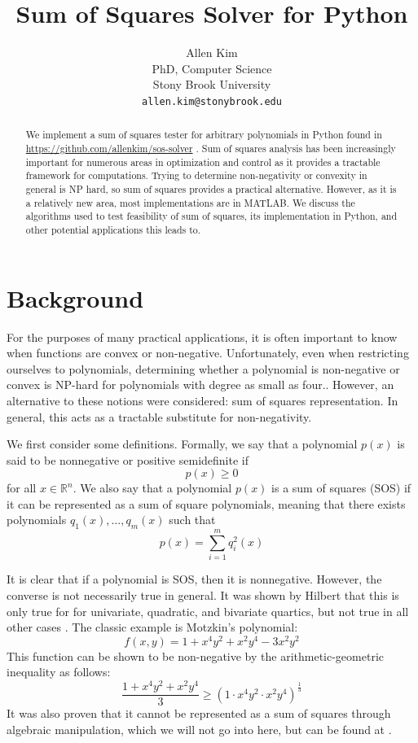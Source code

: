 \documentclass{article}
\title{Sum of Squares Solver for Python}
\author{
  Allen Kim \\
  PhD, Computer Science\\
  Stony Brook University\\
  \texttt{allen.kim@stonybrook.edu} \\
}
\begin{document}

\maketitle

\begin{abstract}
    We implement a sum of squares tester for arbitrary polynomials in Python found in \url{https://github.com/allenkim/sos-solver} . Sum of squares analysis has been increasingly important for numerous areas in optimization and control as it provides a tractable framework for computations. Trying to determine non-negativity or convexity in general is NP hard, so sum of squares provides a practical alternative. However, as it is a relatively new area, most implementations are in MATLAB. We discuss the algorithms used to test feasibility of sum of squares, its implementation in Python, and other potential applications this leads to.
\end{abstract}

\section{Background}

For the purposes of many practical applications, it is often important to know when functions are convex or non-negative. Unfortunately, even when restricting ourselves to polynomials, determining whether a polynomial is non-negative or convex is NP-hard for polynomials with degree as small as four.. However, an alternative to these notions were considered: sum of squares representation. In general, this acts as a tractable substitute for non-negativity.

We first consider some definitions. Formally, we say that a polynomial $p(x)$ is said to be nonnegative or positive semidefinite if \[p(x) \ge 0\] 
for all $x \in \mathbb{R}^n$. We also say that a
polynomial $p(x)$ is a sum of squares (SOS) if it can be represented as a sum of square polynomials, meaning that there exists polynomials $q_1(x),\ldots,q_m(x)$ such that \[p(x) = \sum_{i=1}^m q_i^2(x)\]

It is clear that if a polynomial is SOS, then it is nonnegative. However, the converse is not necessarily true in general. It was shown by Hilbert that this is only true for for univariate, quadratic, and bivariate quartics, but not true in all other cases \cite{sos_convex}. The classic example is Motzkin's polynomial:
\[f(x,y) = 1 + x^4y^2 + x^2y^4 - 3x^2y^2\]
This function can be shown to be non-negative by the arithmetic-geometric inequality as follows:
\[\frac{1+x^4y^2 + x^2y^4}{3} \ge (1 \cdot x^4y^2 \cdot x^2y^4)^\frac{1}{3}\]
It was also proven that it cannot be represented as a sum of squares through algebraic manipulation, which we will not go into here, but can be found at \cite{hilbert}.
\end{document}
